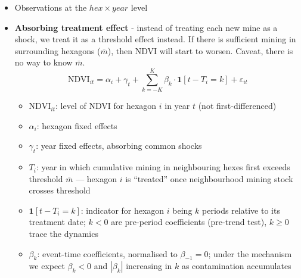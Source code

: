 \documentclass[12pt]{article}
\begin{document}
\begin{itemize}
\item Observations at the $hex \times year$ level
\item \textbf{Absorbing treatment effect} - instead of treating each new mine as a shock, we treat it as a threshold effect instead. If there is sufficient mining in surrounding hexagons ($\bar{m}$), then NDVI will start to worsen. Caveat, there is no way to know $\bar{m}$. 
\begin{equation}
\text{NDVI}_{it} = \alpha_i + \gamma_t + \sum_{k=-K}^{K} \beta_k \cdot \mathbf{1}[t - T_i = k] + \varepsilon_{it}
\end{equation}

\begin{itemize}
    \item $\text{NDVI}_{it}$: level of NDVI for hexagon $i$ in year $t$ (not first-differenced)
    \item $\alpha_i$: hexagon fixed effects
    \item $\gamma_t$: year fixed effects, absorbing common shocks
    \item $T_i$: year in which cumulative mining in neighbouring hexes first exceeds threshold $\bar{m}$ --- hexagon $i$ is ``treated'' once neighbourhood mining stock crosses threshold
    \item $\mathbf{1}[t - T_i = k]$: indicator for hexagon $i$ being $k$ periods relative to its treatment date; $k < 0$ are pre-period coefficients (pre-trend test), $k \geq 0$ trace the dynamics
    \item $\beta_k$: event-time coefficients, normalised to $\beta_{-1} = 0$; under the mechanism we expect $\beta_k < 0$ and $|\beta_k|$ increasing in $k$ as contamination accumulates
\end{itemize}
\end{itemize} 
\end{document}
